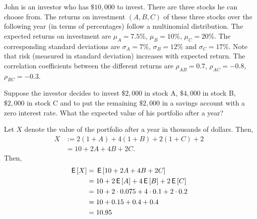 John is an investor who has $\$ 10,000$ to invest.
There are three stocks he can choose from.
The returns on investment $(A,B,C)$ of these three stocks over the following year (in terms of percentages) follow a multinomial distribution.
The expected returns on investment are $\mu_A = 7.5 \%$, $\mu_B = 10\%$, $\mu_C = 20\%$.
The corresponding standard deviations are $\sigma_A = 7\%$, $\sigma_B = 12 \%$ and $\sigma_C = 17\%$.
Note that risk (measured in standard deviation) increases with expected return.
The correlation coefficients between the different returns are $\rho_{AB} = 0.7$, $\rho_{AC} = -0.8$, $\rho_{BC} = -0.3$.

\begin{exercise}
Suppose the investor decides to invest $\$ 2,000$ in stock A, $\$4,000$ in stock B, $\$2,000$ in stock C and to put the remaining $\$ 2,000$ in a savings account with a zero interest rate. What the expected value of his portfolio after a year?
\begin{solution}
Let $X$ denote the value of the portfolio after a year in thousands of dollars. Then,
\begin{align}
    X &:= 2(1 + A) + 4(1 + B) + 2(1 + C) + 2 \\
    &= 10 + 2A + 4B + 2C.
\end{align}
Then,
\begin{align}
    \,\mathsf{E}\left[X\right] &= \,\mathsf{E}\left[ 10 + 2A + 4B + 2C \right] \\
    &= 10 + 2\,\mathsf{E}\left[A\right] + 4\,\mathsf{E}\left[B\right] + 2\,\mathsf{E}\left[C\right] \\
    &= 10 + 2\cdot 0.075  + 4 \cdot 0.1  + 2 \cdot 0.2 \\
    &= 10 + 0.15  + 0.4  + 0.4 \\
    &= 10.95
\end{align}
\end{solution}
\end{exercise}

